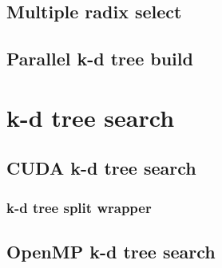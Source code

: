 \begin{appendices}

\subsection{Multiple radix select} %
\label{sec:multiple_radix_select}



\subsection{Parallel k-d tree build} %
\label{sec:paralell_k_d_tree_build}




\section{k-d tree search} %
\label{sec:k_d_tree_search}

\subsection{CUDA k-d tree search} %
\label{sec:cuda_k_d_tree_search}




\subsubsection{k-d tree split wrapper} %
 \label{sub:wrapper}
 






\subsection{OpenMP k-d tree search} %
\label{sec:open_mp_k_d_tree_search}




\end{appendices}
